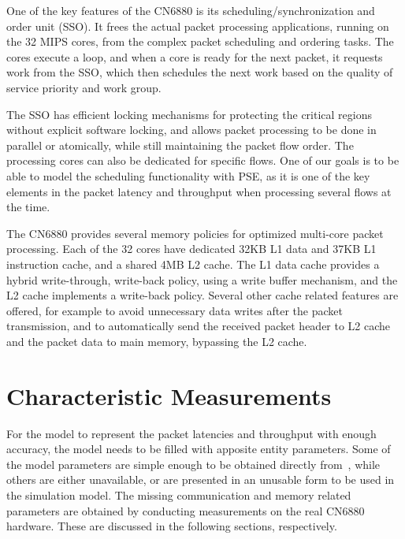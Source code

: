 One of the key features of the CN6880 is its scheduling/synchronization and order unit (SSO). It frees the actual packet processing applications, running on the 32 MIPS cores, from the complex packet scheduling and ordering tasks. The cores execute a loop, and when a core is ready for the next packet, it requests work from the SSO, which then schedules the next work based on the quality of service priority and work group.~\cite{cavium:2010:fundamentals}

The SSO has efficient locking mechanisms for protecting the critical regions without explicit software locking, and allows packet processing to be done in parallel or atomically, while still maintaining the packet flow order. The processing cores can also be dedicated for specific flows. One of our goals is to be able to model the scheduling functionality with PSE, as it is one of the key elements in the packet latency and throughput when processing several flows at the time.~\cite{cavium:2010:fundamentals}


The CN6880 provides several memory policies for optimized multi-core packet processing. Each of the 32 cores have dedicated 32KB L1 data and 37KB L1 instruction cache, and a shared 4MB L2 cache. The L1 data cache provides a hybrid write-through, write-back policy, using a write buffer mechanism, and the L2 cache implements a write-back policy. Several other cache related features are offered, for example to avoid unnecessary data writes after the packet transmission, and to automatically send the received packet header to L2 cache and the packet data to main memory, bypassing the L2 cache.~\cite{cavium:2010:fundamentals}

\section{Characteristic Measurements}
\label{sec:characteristic-measurements}

For the model to represent the packet latencies and throughput with enough accuracy, the model needs to be filled with apposite entity parameters. Some of the model parameters are simple enough to be obtained directly from~\cite{cavium:2010:fundamentals}, while others are either unavailable, or are presented in an unusable form to be used in the simulation model. The missing communication and memory related parameters are obtained by conducting measurements on the real CN6880 hardware. These are discussed in the following sections, respectively.

